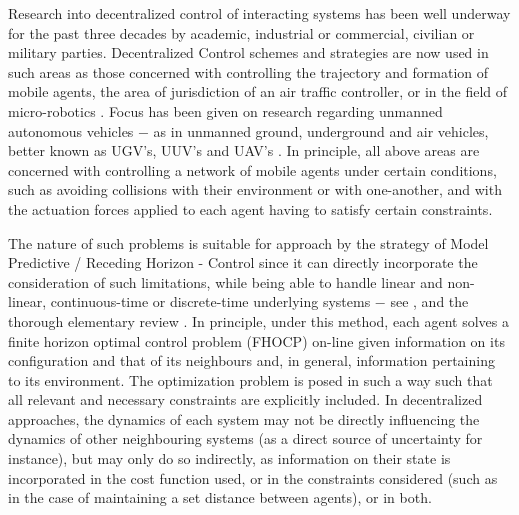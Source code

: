 Research into decentralized control of interacting systems has been well
underway for the past three decades by academic, industrial or commercial,
civilian or military parties. Decentralized Control schemes and strategies are
now used in such areas as those concerned with controlling the trajectory and
formation of mobile agents, the area of jurisdiction of an air traffic
controller\cite{4459797}, or in the field of micro-robotics
\cite{iswarm}\cite{micron}. Focus has been given on research regarding unmanned
autonomous vehicles $-$ as in unmanned ground,
underground and air vehicles, better known as UGV's, UUV's and
UAV's \cite{1429425}\cite{Dunbar2006549}\cite{4389042}\cite{1470732}.
In principle, all above areas are concerned with controlling a network of
mobile agents under certain conditions, such as avoiding collisions with their
environment or with one-another, and with the actuation forces applied to each
agent having to satisfy certain constraints.

The nature of such problems is suitable for approach by the strategy of
Model Predictive / Receding Horizon - Control since it can directly incorporate
the consideration of such limitations, while being able to handle linear and
non-linear, continuous-time or discrete-time underlying systems $-$ see
\cite{FINDEISEN2003190}\cite{262032}\cite{grune2016nonlinear}, and the thorough
elementary review \cite{Mayne2000789}. In principle, under this method, each
agent solves a finite horizon optimal control problem (FHOCP) on-line given
information on its configuration and that of its neighbours and, in general,
information pertaining to its environment. The optimization problem is posed in
such a way such that all relevant and necessary constraints are explicitly
included. In decentralized approaches, the dynamics of each system may not be
directly influencing the dynamics of other neighbouring systems (as a direct
source of uncertainty for instance), but may only do so indirectly, as
information on their state is incorporated in the cost function used, or in the
constraints considered (such as in the case of maintaining a set distance
between agents), or in both.


